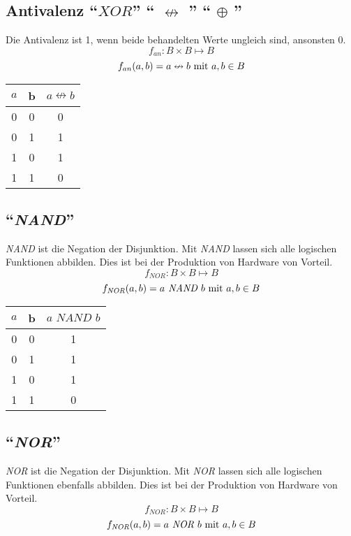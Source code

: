 \subsection{Antivalenz "`$XOR$"' "` $\nleftrightarrow$ "' "` $\oplus$ "'}
Die Antivalenz ist 1, wenn beide behandelten Werte ungleich sind, ansonsten 0.
$$ f_{an}: B \times B \mapsto B $$
$$ f_{an}(a, b) = a \nleftrightarrow b \textnormal{ mit } a, b \in B$$

\begin{center}
\begin{tabular}{ccc}
	$a$ & b & $a \nleftrightarrow b$ \\ \hline
	 0  & 0 &    0    \\
	 0  & 1 &    1    \\
	 1  & 0 &    1    \\
	 1  & 1 &    0    \\
\end{tabular}
\end{center}

\subsection{"`\textit{NAND}"'}
\textit{NAND} ist die Negation der Disjunktion. Mit \textit{NAND} lassen sich alle logischen Funktionen abbilden. Dies ist bei der Produktion von Hardware von Vorteil. 
$$ f_{\textit{NOR}}: B \times B \mapsto B $$
$$ f_{\textit{NOR}}(a, b) = a \textit{ NAND } b \textnormal{ mit } a, b \in B$$

\begin{center}
\begin{tabular}{ccc}
	$a$ & b & $a \textit{ NAND } b$ \\ \hline
	 0  & 0 &    1    \\
	 0  & 1 &    1    \\
	 1  & 0 &    1    \\
	 1  & 1 &    0    \\
\end{tabular}
\end{center}

\subsection{"`\textit{NOR}"'}
\textit{NOR} ist die Negation der Disjunktion. Mit \textit{NOR} lassen sich alle logischen Funktionen ebenfalls abbilden. Dies ist bei der Produktion von Hardware von Vorteil. 
$$ f_{\textit{NOR}}: B \times B \mapsto B $$
$$ f_{\textit{NOR}}(a, b) = a \textit{ NOR } b \textnormal{ mit } a, b \in B$$


